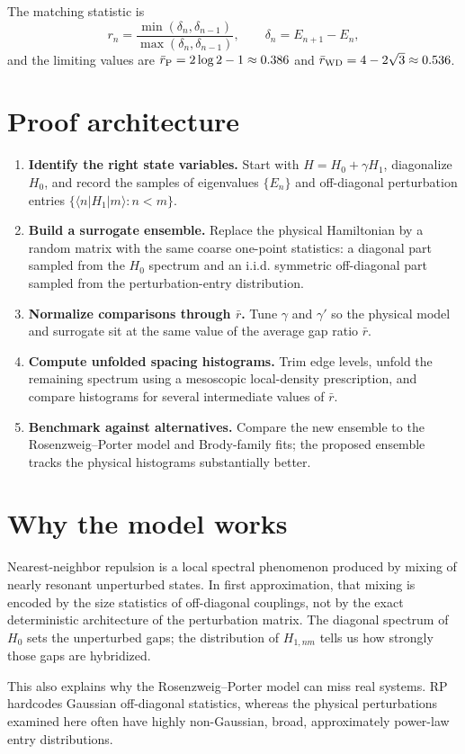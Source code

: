 \documentclass[11pt]{article}
\begin{document}
The matching statistic is
\[
r_n=\frac{\min(\delta_n,\delta_{n-1})}{\max(\delta_n,\delta_{n-1})}, \qquad \delta_n = E_{n+1}-E_n,
\]
and the limiting values are $\bar r_{\rm P}=2\log 2-1\approx 0.386$ and $\bar r_{\rm WD}=4-2\sqrt 3\approx 0.536$.

\section*{Proof architecture}
\begin{enumerate}
\item \textbf{Identify the right state variables.} Start with $H=H_0+\gamma H_1$, diagonalize $H_0$, and record the samples of eigenvalues $\{E_n\}$ and off-diagonal perturbation entries $\{\langle n|H_1|m\rangle:n<m\}$.
\item \textbf{Build a surrogate ensemble.} Replace the physical Hamiltonian by a random matrix with the same coarse one-point statistics: a diagonal part sampled from the $H_0$ spectrum and an i.i.d. symmetric off-diagonal part sampled from the perturbation-entry distribution.
\item \textbf{Normalize comparisons through $\bar r$.} Tune $\gamma$ and $\gamma'$ so the physical model and surrogate sit at the same value of the average gap ratio $\bar r$.
\item \textbf{Compute unfolded spacing histograms.} Trim edge levels, unfold the remaining spectrum using a mesoscopic local-density prescription, and compare histograms for several intermediate values of $\bar r$.
\item \textbf{Benchmark against alternatives.} Compare the new ensemble to the Rosenzweig--Porter model and Brody-family fits; the proposed ensemble tracks the physical histograms substantially better.
\end{enumerate}

\section*{Why the model works}
Nearest-neighbor repulsion is a local spectral phenomenon produced by mixing of nearly resonant unperturbed states. In first approximation, that mixing is encoded by the size statistics of off-diagonal couplings, not by the exact deterministic architecture of the perturbation matrix. The diagonal spectrum of $H_0$ sets the unperturbed gaps; the distribution of $H_{1,nm}$ tells us how strongly those gaps are hybridized.

This also explains why the Rosenzweig--Porter model can miss real systems. RP hardcodes Gaussian off-diagonal statistics, whereas the physical perturbations examined here often have highly non-Gaussian, broad, approximately power-law entry distributions.
\end{document}
